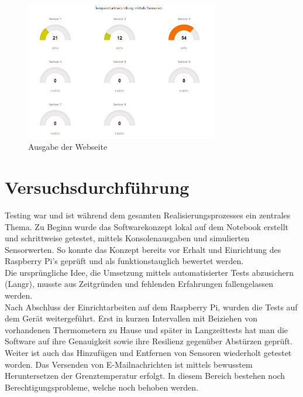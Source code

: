 \begin{figure}[H]%
\centering
\includegraphics[width=0.75\textwidth]{Images/Webseite.png}
\caption{Ausgabe der Webseite}
\label{fig:webpage}
\end{figure}

\section{Versuchsdurchführung}
Testing war und ist während dem gesamten Realisierungsprozesses ein zentrales Thema. Zu Beginn wurde das Softwarekonzept lokal auf dem Notebook erstellt und schrittweise getestet, mittels Konsolenausgaben und simulierten Sensorwerten. So konnte das Konzept bereits vor Erhalt und Einrichtung des Raspberry Pi's geprüft und als funktionstauglich bewertet werden.\\
Die ursprüngliche Idee, die Umsetzung mittels automatisierter Tests abzusichern (Langr), musste aus Zeitgründen und fehlenden Erfahrungen fallengelassen werden.\\
Nach Abschluss der Einrichtarbeiten auf dem Raspberry Pi, wurden die Tests auf dem Gerät weitergeführt. Erst in kurzen Intervallen mit Beiziehen von vorhandenen Thermometern zu Hause und später in Langzeittests hat man die Software auf ihre Genauigkeit sowie ihre Resilienz gegenüber Abstürzen geprüft. Weiter ist auch das Hinzufügen und Entfernen von Sensoren wiederholt getestet worden. Das Versenden von E-Mailnachrichten ist mittels bewusstem Heruntersetzen der Grenztemperatur erfolgt. In diesem Bereich bestehen noch Berechtigungsprobleme, welche noch behoben werden.